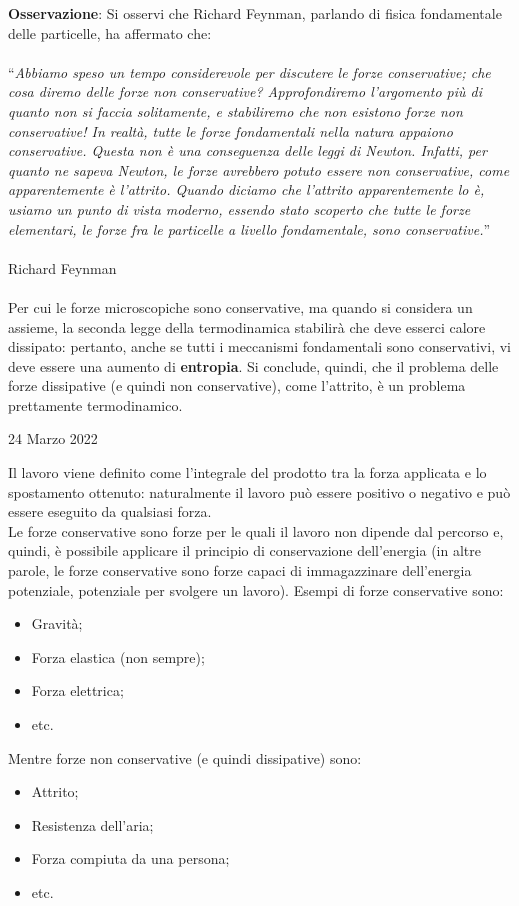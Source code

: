 \documentclass[a4paper]{extarticle}
\newcommand{\quotes}[1]{``#1''}
\begin{document}
\vspace{1em}
\noindent
\textbf{Osservazione}: Si osservi che Richard Feynman, parlando di fisica fondamentale delle particelle, ha affermato che:\\\\
\quotes{\emph{Abbiamo speso un tempo considerevole per discutere le forze conservative; che cosa diremo delle forze non conservative? Approfondiremo l'argomento più di quanto non si faccia solitamente, e stabiliremo che non esistono forze non conservative! In realtà, tutte le forze fondamentali nella natura appaiono conservative. Questa non è una conseguenza delle leggi di Newton. Infatti, per quanto ne sapeva Newton, le forze avrebbero potuto essere non conservative, come apparentemente è l'attrito. Quando diciamo che l'attrito apparentemente lo è, usiamo un punto di vista moderno, essendo stato scoperto che tutte le forze elementari, le forze fra le particelle a livello fondamentale, sono conservative.}}\\\\
\hspace{10em} Richard Feynman\\\\
Per cui le forze microscopiche sono conservative, ma quando si considera un assieme, la seconda legge della termodinamica stabilirà che deve esserci calore dissipato: pertanto, anche se tutti i meccanismi fondamentali sono conservativi, vi deve essere una aumento di \textbf{entropia}. Si conclude, quindi, che il problema delle forze dissipative (e quindi non conservative), come l'attrito, è un problema prettamente termodinamico.

\newpage
\noindent
\begin{center}
  24 Marzo 2022
\end{center}
Il lavoro viene definito come l'integrale del prodotto tra la forza applicata e lo spostamento ottenuto: naturalmente il lavoro può essere positivo o negativo e può essere eseguito da qualsiasi forza.\\
Le forze conservative sono forze per le quali il lavoro non dipende dal percorso e, quindi, è possibile applicare il principio di conservazione dell'energia (in altre parole, le forze conservative sono forze capaci di immagazzinare dell'energia potenziale, potenziale per svolgere un lavoro). Esempi di forze conservative sono:
\begin{itemize}
  \item Gravità;
  \item Forza elastica (non sempre);
  \item Forza elettrica;
  \item etc.
\end{itemize}
Mentre forze non conservative (e quindi dissipative) sono:
\begin{itemize}
  \item Attrito;
  \item Resistenza dell'aria;
  \item Forza compiuta da una persona;
  \item etc.
\end{itemize}
\end{document}
